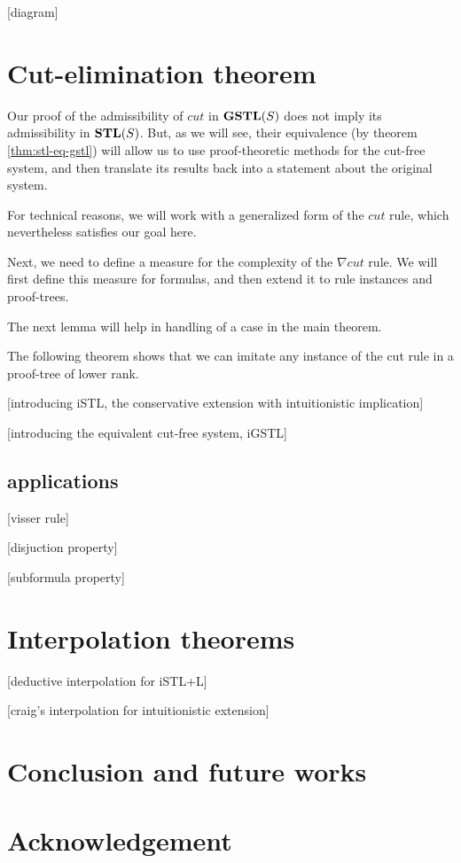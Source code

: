 \documentclass[12pt,a4paper]{article}
\begin{document}
[diagram]

\section{Cut-elimination theorem}
Our proof of the admissibility of $cut$ in $\mathbf{GSTL}(S)$ does not imply its admissibility in $\mathbf{STL}(S)$. But, as we will see, their equivalence (by theorem \ref{thm:stl-eq-gstl}) will allow us to use proof-theoretic methods for the cut-free system, and then translate its results back into a statement about the original system.

For technical reasons, we will work with a generalized form of the $cut$ rule, which nevertheless satisfies our goal here.





Next, we need to define a measure for the complexity of the $\nabla cut$ rule. We will first define this measure for formulas, and then extend it to rule instances and proof-trees.



The next lemma will help in handling of a case in the main theorem.



The following theorem shows that we can imitate any instance of the cut rule in a proof-tree of lower rank.



[introducing iSTL, the conservative extension with intuitionistic implication]

[introducing the equivalent cut-free system, iGSTL]

\subsection{applications}
[visser rule]

[disjuction property]

[subformula property]

\section{Interpolation theorems}
[deductive interpolation for iSTL+L]

[craig's interpolation for intuitionistic extension]

\section{Conclusion and future works}

\section{Acknowledgement}



\end{document}
